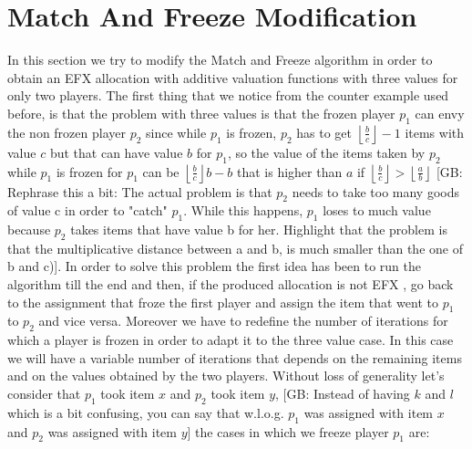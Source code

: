 \documentclass{article}
\newcommand{\gb}[1]{{\color{red}[GB: #1]}}
\begin{document}
\section{Match And Freeze Modification}
In this section we try to modify the Match and Freeze algorithm in order to obtain an EFX allocation with additive valuation functions with three values for only two players. The first thing that we notice from the counter example used before, is that the problem with three values is that the frozen player $p_1$ can envy the non frozen player $p_2$ since while $p_1$ is frozen, $p_2$ has to get $\left \lfloor \frac{b}{c}\right \rfloor -1$ items with value $c$ but that can have value $b$ for $p_1$, so the value of the items taken by $p_2$ while $p_1$ is frozen for $p_1$ can be $\left \lfloor \frac{b}{c}\right \rfloor b - b$ that is higher than $a$ if $\left \lfloor \frac{b}{c}\right \rfloor > \left \lfloor \frac{a}{b}\right \rfloor$
\gb{Rephrase this a bit: The actual problem is that $p_2$ needs to take too many goods of value c in order to "catch" $p_1$. While this happens, $p_1$ loses to much  value because $p_2$ takes items that have value b for her. Highlight that the problem is that the multiplicative distance between a and b, is much smaller than the one of b and c)}. 
In order to solve this problem the first idea has been to run the algorithm till the end and then, if the produced allocation is not EFX
, go back to the assignment that froze the first player and assign the item that went to $p_1$ to $p_2$ and vice versa.
Moreover we have to redefine the number of iterations for which a player is frozen in order to adapt it to the three value case. In this case we will have a variable number of iterations that depends on the remaining items and on the values obtained by the two players. Without loss of generality let's consider that $p_1$ took item $x$ and $p_2$ took item $y$,
\gb{Instead of having $k$ and $l$ which is a bit confusing, you can say that w.l.o.g. $p_1$ was assigned with item $x$ and $p_2$ was assigned with item $y$}
the cases in which we freeze player $p_1$ are: 
\end{document}
